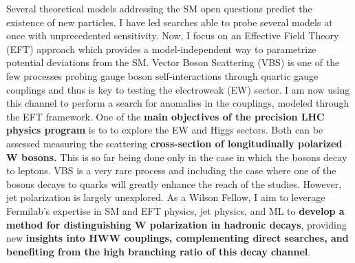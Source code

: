 {\begin{flushleft}
Several theoretical models addressing the SM open questions predict the existence of new particles. I have led searches able to probe several models at once with unprecedented sensitivity. Now, I focus on an Effective Field Theory (EFT) approach which provides a model-independent way to parametrize potential deviations from the SM. Vector Boson Scattering (VBS) is one of the few processes probing gauge boson self-interactions through quartic gauge couplings and thus is key to testing the electroweak (EW) sector. I am now using this channel to perform a search for anomalies in the couplings, modeled through the EFT framework. 
One of the {\bf main objectives of the precision LHC physics program} is to to explore the EW and Higgs sectors. Both can be assessed measuring the scattering {\bf cross-section of longitudinally polarized W bosons.} This is so far being done only in the case in which the bosons decay to leptons. VBS is a very rare process and including the case where one of the bosons decays to quarks will greatly enhance the reach of the studies. However, jet polarization is largely unexplored. As a Wilson Fellow, I aim to leverage Fermilab’s expertise in SM and EFT physics, jet physics, and ML to {\bf develop a method for distinguishing W polarization in hadronic decays}, providing new {\bf insights into HWW couplings, complementing direct searches, and benefiting from the high branching ratio of this decay channel}. %


\end{flushleft}}
